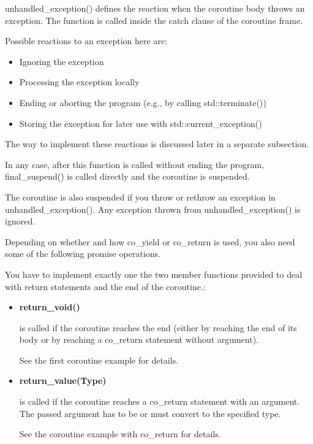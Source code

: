 unhandled\_exception() defines the reaction when the coroutine body throws an exception. The function is called inside the catch clause of the coroutine frame.

Possible reactions to an exception here are:

\begin{itemize}
\item 
Ignoring the exception

\item 
Processing the exception locally

\item 
Ending or aborting the program (e.g., by calling std::terminate())

\item 
Storing the exception for later use with std::current\_exception()
\end{itemize}

The way to implement these reactions is discussed later in a separate subsection.

In any case, after this function is called without ending the program, final\_suspend() is called directly and the coroutine is suspended.

The coroutine is also suspended if you throw or rethrow an exception in unhandled\_exception(). Any exception thrown from unhandled\_exception() is ignored.


Depending on whether and how co\_yield or co\_return is used, you also need some of the following promise operations.


You have to implement exactly one the two member functions provided to deal with return statements and the end of the coroutine.:

\begin{itemize}
\item 
\textbf{return\_void()}

is called if the coroutine reaches the end (either by reaching the end of its body or by reaching a co\_return statement without argument).

See the first coroutine example for details.

\item 
\textbf{return\_value(Type)}

is called if the coroutine reaches a co\_return statement with an argument. The passed argument has to be or must convert to the specified type.

See the coroutine example with co\_return for details.
\end{itemize}


